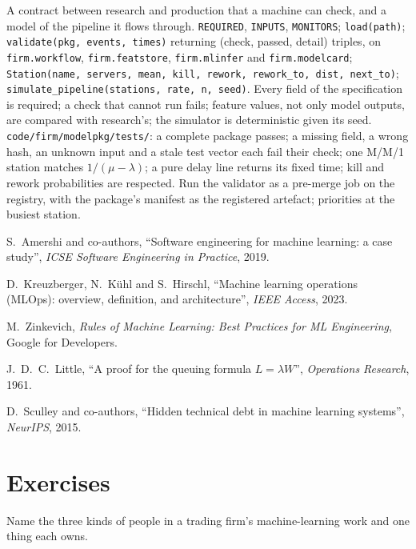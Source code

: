 \begin{build}
 A contract between research and production that a machine can check, and a model of the pipeline it flows through.
 \texttt{REQUIRED}, \texttt{INPUTS}, \texttt{MONITORS}; \texttt{load(path)}; \texttt{validate(pkg, events,
times)} returning (check, passed, detail) triples, on \texttt{firm.workflow}, \texttt{firm.featstore}, \texttt{firm.mlinfer} and
\texttt{firm.modelcard}; \texttt{Station(name, servers, mean, kill, rework, rework\_to, dist, next\_to)};
\texttt{simulate\_pipeline(stations, rate, n, seed)}.
 Every field of the specification is required; a check that cannot run fails; feature values, not only model
outputs, are compared with research's; the simulator is deterministic given its seed.
 \texttt{code/firm/modelpkg/tests/}: a complete package passes; a missing field, a wrong hash, an
unknown input and a stale test vector each fail their check; one M/M/1 station matches $1/(\mu-\lambda)$; a pure delay line
returns its fixed time; kill and rework probabilities are respected.
 Run the validator as a pre-merge job on the registry, with the package's manifest as the registered artefact;
priorities at the busiest station.
\end{build}

\begin{omsources}
\item S.~Amershi and co-authors, ``Software engineering for machine learning: a case study'', \emph{ICSE Software Engineering
in Practice}, 2019.
\item D.~Kreuzberger, N.~Kühl and S.~Hirschl, ``Machine learning operations (MLOps): overview, definition, and
architecture'', \emph{IEEE Access}, 2023.
\item M.~Zinkevich, \emph{Rules of Machine Learning: Best Practices for ML Engineering}, Google for Developers.
\item J.~D.~C.~Little, ``A proof for the queuing formula $L=\lambda W$'', \emph{Operations Research}, 1961.
\item D.~Sculley and co-authors, ``Hidden technical debt in machine learning systems'', \emph{NeurIPS}, 2015.
\end{omsources}

\section{Exercises}

\begin{exercise}[$\star$]\label{exo:ml:the-machine-learning-team:1}
Name the three kinds of people in a trading firm's machine-learning work and one thing each owns.
\end{exercise}

